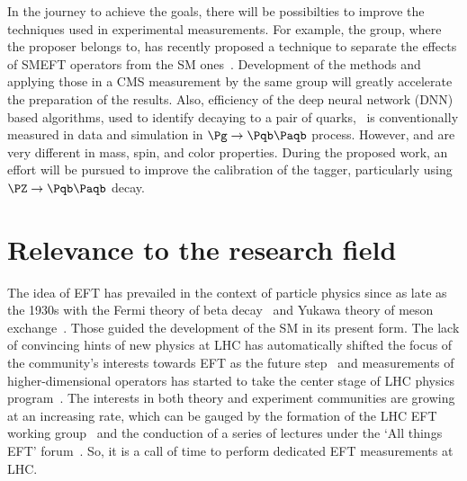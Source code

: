 \documentclass[a4paper,11pt]{article}
\newcommand{\Pb}{{{\Pqb}}\xspace}
\newcommand{\PAb}{{{{\Paqb}}}\xspace}
\begin{document}
In the journey to achieve the goals, there will be possibilties to improve the techniques used in experimental measurements. 
For example, the group, where the proposer belongs to, has recently proposed a technique to separate the effects of SMEFT operators from the SM ones~\cite{Chatterjee:2021nms}.
Development of the methods and applying those in a CMS measurement by the same group will greatly accelerate the preparation of the results. 
Also, efficiency of the deep neural network (DNN) based algorithms, used to identify \PH decaying to a pair of \Pb quarks, \
is conventionally measured in data and simulation in $\Pg \to \Pb \PAb$ process. 
However, \Pg and \PH are very different in mass, spin, and color properties. During the proposed work, an effort will be pursued to improve the calibration of the tagger, 
particularly using $\PZ \to \Pb \PAb$ decay.


\section{Relevance to the research field}

The idea of EFT has prevailed in the context of particle physics since as late as the 1930s with the Fermi theory of beta decay~\cite{Fermi:1934hr} and Yukawa theory of meson exchange~\cite{Yukawa:1935xg}.
Those guided %
the development of the SM in its present form. 
The lack of convincing hints of new physics at LHC has automatically shifted the focus of the community's interests towards EFT as the future step~\cite{Ellis:2018gqa,Ellis:2020unq,Ethier:2021bye} 
and measurements of higher-dimensional operators has started to take the center stage of LHC physics program~\cite{CMS:2021nnc,CMS:2021aly,CMS:2021gme}.
The interests in both theory and experiment communities are growing at an increasing rate, 
which can be gauged by the formation of the LHC EFT working group~\cite{LHC_EFT_WG} and the conduction of a series of lectures under the `All things EFT' forum~\cite{All_EFT}.
So, it is a call of time to perform dedicated EFT measurements at LHC.
\end{document}
